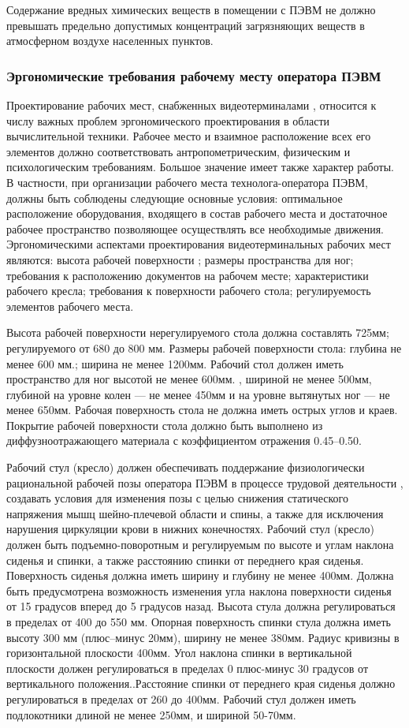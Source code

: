 Содержание вредных химических веществ в помещении с ПЭВМ не должно превышать предельно
допустимых концентраций загрязняющих веществ в атмосферном воздухе населенных пунктов.


\subsubsection{Эргономические требования рабочему месту оператора ПЭВМ}
Проектирование рабочих мест, снабженных видеотерминалами , относится к числу важных
проблем эргономического проектирования в области вычислительной техники. Рабочее место и
взаимное расположение всех его элементов должно соответствовать антропометрическим,
физическим и психологическим требованиям. Большое значение имеет также характер работы.
В частности, при организации рабочего места технолога-оператора ПЭВМ, должны быть соблюдены
следующие основные условия: оптимальное расположение оборудования, входящего в состав
рабочего места и достаточное рабочее пространство позволяющее осуществлять все необходимые
движения. Эргономическими аспектами проектирования видеотерминальных рабочих мест являются:
высота рабочей поверхности ; размеры пространства для ног; требования к расположению документов
на рабочем месте; характеристики рабочего кресла; требования к поверхности рабочего стола;
регулируемость элементов рабочего места.

Высота рабочей поверхности нерегулируемого стола должна составлять  725мм;
регулируемого от 680 до 800 мм. Размеры рабочей поверхности стола: глубина
не менее  600 мм.; ширина не менее 1200мм. Рабочий стол должен иметь пространство для ног
высотой не  менее 600мм. , шириной не менее 500мм,  глубиной на уровне колен --- не менее 450мм
и на уровне вытянутых ног --- не менее 650мм. Рабочая поверхность стола не должна иметь острых
углов и краев. Покрытие рабочей поверхности стола должно быть выполнено из диффузноотражающего
материала с коэффициентом отражения 0.45--0.50.

Рабочий стул (кресло) должен обеспечивать поддержание физиологически 
рациональной рабочей позы оператора ПЭВМ в процессе трудовой 
деятельности , создавать условия для изменения позы с целью снижения 
статического напряжения мышц шейно-плечевой области и спины, а также
для исключения нарушения циркуляции крови в нижних конечностях.
Рабочий стул (кресло) должен быть подъемно-поворотным и регулируемым
по высоте и углам наклона сиденья и спинки, а также расстоянию спинки от 
переднего края сиденья. Поверхность сиденья должна иметь ширину и глубину не менее 400мм.
Должна быть предусмотрена возможность изменения угла наклона поверхности сиденья от 15
градусов вперед  до 5 градусов назад. Высота стула должна регулироваться в пределах от 400 до
550 мм. Опорная поверхность спинки стула должна иметь высоту  300 мм (плюс--минус 20мм),
ширину не менее 380мм. Радиус кривизны в горизонтальной плоскости 400мм.
Угол наклона спинки в вертикальной плоскости должен регулироваться
 в пределах 0 плюс-минус 30 градусов от вертикального положения..Расстояние
спинки от переднего края сиденья должно регулироваться в пределах от 260
до 400мм. Рабочий стул должен иметь подлокотники длиной не менее 250мм, 
и шириной 50-70мм.


